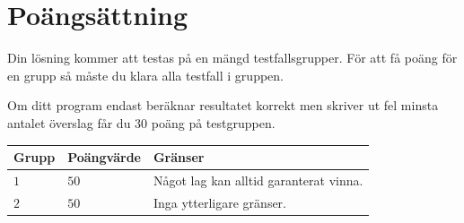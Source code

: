 \section*{Poängsättning}
Din lösning kommer att testas på en mängd testfallsgrupper.
För att få poäng för en grupp så måste du klara alla testfall i gruppen.

Om ditt program endast beräknar resultatet korrekt men skriver ut fel minsta antalet överslag får du $30$ poäng på testgruppen.
\noindent
\begin{tabular}{| l | l | p{12cm} |}
  \hline
  Grupp & Poängvärde & Gränser \\ \hline
  $1$    & $50$        & Något lag kan alltid garanterat vinna.\\ \hline 
  $2$    & $50$        & Inga ytterligare gränser. \\ \hline 
\end{tabular}

